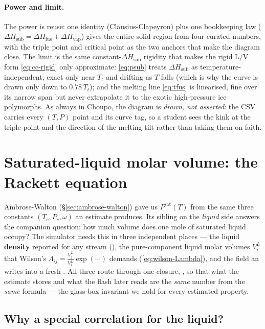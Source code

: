 \documentclass[11pt,a4paper]{article}
\newcommand{\Psat}{P^{\mathrm{sat}}}
\newcommand{\Hvap}{\Delta H_{\!\mathrm{vap}}}
\newcommand{\Hsub}{\Delta H_{\!\mathrm{sub}}}
\newcommand{\Hfus}{\Delta H_{\!\mathrm{fus}}}
\begin{document}
\paragraph{Power and limit.}  The power is reuse: one identity
(Clausius-Clapeyron) plus one bookkeeping law ($\Hsub=\Hfus+\Hvap$)
gives the entire solid region from four curated numbers, with the
triple point and critical point as the two anchors that make the
diagram close.  The limit is the same constant-$\Hsub$ rigidity that
makes the rigid L/V form \eqref{eq:cc-rigid} only approximate:
\eqref{eq:psub} treats $\Hsub$ as temperature-independent, exact only
near $T_t$ and drifting as $T$ falls (which is why the curve is drawn
only down to $0.78\,T_t$); and the melting line \eqref{eq:tfus} is
linearised, fine over its narrow span but never extrapolate it to the
exotic high-pressure ice polymorphs.  As always in Choupo, the diagram
is \emph{drawn, not asserted}: the CSV carries every $(T,P)$ point and
its curve tag, so a student sees the kink at the triple point and the
direction of the melting tilt rather than taking them on faith.

\section{Saturated-liquid molar volume: the Rackett equation}\label{ch:rackett}

Ambrose-Walton (\S\ref{sec:ambrose-walton}) gave us $\Psat(T)$ from the
same three constants $(T_c, P_c, \omega)$ an estimate produces.  Its
sibling on the \emph{liquid} side answers the companion question: how
much volume does one mole of saturated liquid occupy?  The simulator
needs this in three independent places --- the liquid \textbf{density}
reported for any stream (), the
pure-component liquid molar volumes $V_i^L$ that Wilson's
$\Lambda_{ij}=\tfrac{V_j^L}{V_i^L}\exp(\cdots)$ demands
(\eqref{eq:wilson-Lambda}), and the  field an
 writes into a fresh .  All three
route through one closure, , so that what
the estimate stores and what the flash later reads are the \emph{same}
number from the \emph{same} formula --- the glass-box invariant we hold
for every estimated property.

\subsection{Why a special correlation for the liquid?}
\end{document}
